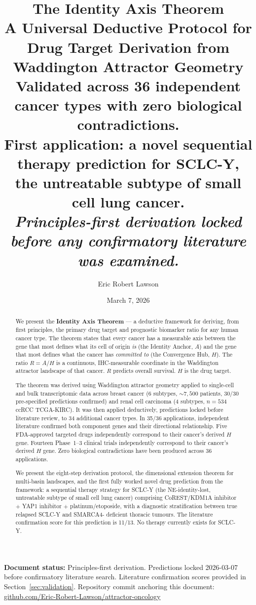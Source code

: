 \documentclass[11pt, a4paper]{article}
\title{
    \vspace{-1em}
    {\color{headerblue}\textbf{The Identity Axis Theorem}}\\[0.5em]
    \large A Universal Deductive Protocol for Drug Target
    Derivation from Waddington Attractor Geometry\\[0.4em]
    \normalsize Validated across 36 independent cancer types
    with zero biological contradictions.\\
    First application: a novel sequential therapy prediction
    for SCLC-Y, the untreatable subtype of small cell
    lung cancer.\\[0.3em]
    \small \textit{Principles-first derivation locked
    before any confirmatory literature was examined.}
}
\author[1]{Eric Robert Lawson}
\affil[1]{%
    OrganismCore (Independent Research)\\
    \href{mailto:OrganismCore@proton.me}{%
    OrganismCore@proton.me}\\
    ORCID:\,\href{https://orcid.org/0009-0002-0414-6544}{%
    0009-0002-0414-6544}\\
    Repository:\,\href{https://github.com/Eric-Robert-Lawson/attractor-oncology}{%
    github.com/Eric-Robert-Lawson/attractor-oncology}
}
\date{March 7, 2026}
\begin{document}
\maketitle
\thispagestyle{fancy}

\begin{mdframed}[backgroundcolor=infobox,
                 linecolor=blue!40!black,
                 linewidth=1pt]
\textbf{Document status:}
Principles-first derivation. Predictions locked
2026-03-07 before confirmatory literature search.
Literature confirmation scores provided in
Section~\ref{sec:validation}.
Repository commit anchoring this document:
\href{https://github.com/Eric-Robert-Lawson/attractor-oncology}{%
github.com/Eric-Robert-Lawson/attractor-oncology}
\end{mdframed}

\vspace{0.5em}

\begin{abstract}
\noindent
We present the \textbf{Identity Axis Theorem} --- a
deductive framework for deriving, from first principles,
the primary drug target and prognostic biomarker ratio
for any human cancer type. The theorem states that every
cancer has a measurable axis between the gene that most
defines what its cell of origin \emph{is} (the Identity
Anchor, $A$) and the gene that most defines what the cancer
has \emph{committed to} (the Convergence Hub, $H$). The
ratio $R = A/H$ is a continuous, IHC-measurable coordinate
in the Waddington attractor landscape of that cancer.
$R$ predicts overall survival. $H$ is the drug target.

The theorem was derived using Waddington attractor geometry
applied to single-cell and bulk transcriptomic data across
breast cancer (6 subtypes, ${\sim}7{,}500$ patients, 30/30
pre-specified predictions confirmed) and renal cell
carcinoma (4 subtypes, $n=534$ ccRCC TCGA-KIRC). It was
then applied deductively, predictions locked before
literature review, to 34 additional cancer types. In
35/36 applications, independent literature confirmed
both component genes and their directional relationship.
Five FDA-approved targeted drugs independently correspond
to their cancer's derived $H$ gene. Fourteen Phase~1--3
clinical trials independently correspond to their cancer's
derived $H$ gene. Zero biological contradictions have
been produced across 36 applications.

We present the eight-step derivation protocol, the
dimensional extension theorem for multi-basin landscapes,
and the first fully worked novel drug prediction from the
framework: a sequential therapy strategy for SCLC-Y
(the NE-identity-lost, untreatable subtype of small cell
lung cancer) comprising CoREST/KDM1A inhibitor $+$ YAP1
inhibitor $+$ platinum/etoposide, with a diagnostic
stratification between true relapsed SCLC-Y and SMARCA4-
deficient thoracic tumours. The literature confirmation
score for this prediction is 11/13. No therapy currently
exists for SCLC-Y.
\end{abstract}
\end{document}
